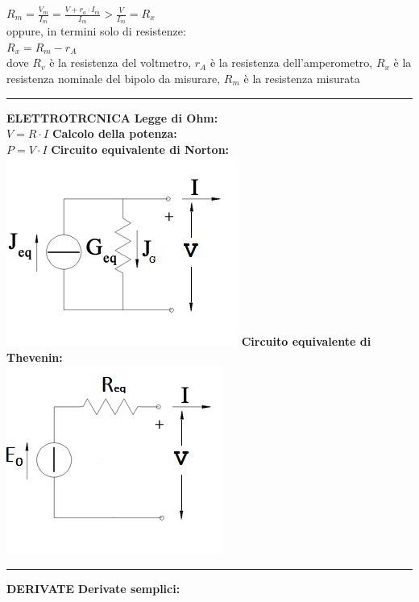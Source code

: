 \documentclass{article}
\begin{document}
\begin{multicols*}{3}
    $R_m = \frac{V_m}{I_m} = \frac{V + r_a \cdot I_m}{I_m} > \frac{V}{I_m} = R_x $ \\
    oppure, in termini solo di resistenze: \\ 
    $R_x = R_m - r_A$ \\
    dove $R_v$ è la resistenza del voltmetro, $r_A$ è la resistenza dell'amperometro, $R_x$ è la resistenza nominale del bipolo da misurare, $R_m$ è la resistenza misurata \newline
    \hrule
    \textbf{ELETTROTRCNICA} \newline 
    \textbf{Legge di Ohm:} \\ 
    $V = R \cdot I$ \newline 
    \textbf{Calcolo della potenza:} \\
    $P = V \cdot I$ \newline
    \textbf{Circuito equivalente di Norton:} \\
    \includegraphics[scale = 0.3]{Norton.png} \newline 
    \textbf{Circuito equivalente di Thevenin:} \\ 
    \includegraphics[scale = 0.3]{Thevenin.png} \newline 
    \hrule 
    \textbf{DERIVATE}\newline 
    \textbf{Derivate semplici:} \\

\end{multicols*}
\end{document}
